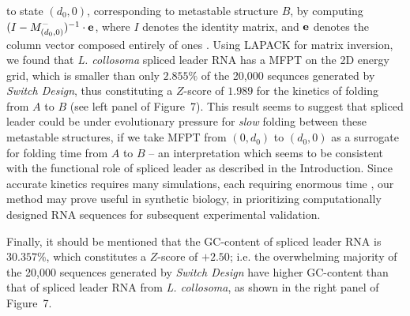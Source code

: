  to state $(d_0,0)$, corresponding to metastable structure $B$,  by
computing $(I - M^{-}_{(d_0,0)})^{-1} \cdot {\bf e}$, where
$I$ denotes the identity matrix, and ${\bf e}$ denotes the column vector
composed entirely of ones \cite{meyerMFPT}. Using LAPACK \cite{LAPACK}
for matrix inversion, we found that
{\em L. collosoma} spliced leader RNA has a
MFPT on the 2D energy grid, which is smaller than only $2.855\%$ of the
20,000 sequnces generated by {\em Switch Design}, thus constituting a
$Z$-score of $1.989$ for the kinetics of folding from $A$ to $B$
(see left panel of Figure~7).
This result seems to suggest that spliced leader could be
under evolutionary pressure for {\em slow} folding between these
metastable structures, if we take
MFPT from $(0,d_0)$ to $(d_0,0)$ as a surrogate for \kinfold \cite{flamm}
folding time from $A$ to $B$ -- an interpretation which seems to be
consistent with the functional role of spliced leader as described
in the Introduction.
Since accurate \kinfold kinetics requires many simulations,
each requiring enormous time \cite{wolfingerStadler:kinetics},
our method may prove useful in synthetic biology, in prioritizing
computationally designed RNA sequences for subsequent
experimental validation.

Finally, it should be mentioned that the GC-content of spliced leader
RNA is
$30.357\%$, which constitutes a $Z$-score of
$+2.50$; i.e. the overwhelming majority of the 20,000 sequences generated
by {\em Switch Design} have higher GC-content than that of spliced leader
RNA from {\em L. collosoma}, as shown in the right panel of
Figure~7.

